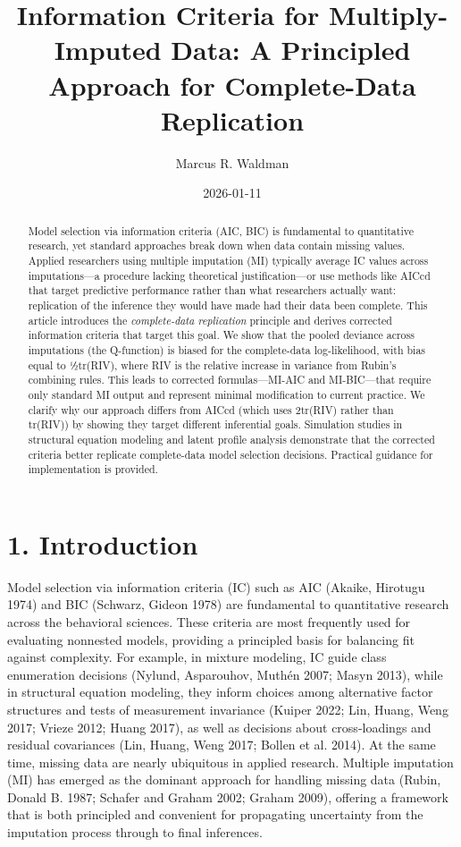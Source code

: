 \documentclass[
]{article}
\title{Information Criteria for Multiply-Imputed Data: A Principled
Approach for Complete-Data Replication}
\author{Marcus R. Waldman}
\date{2026-01-11}
\begin{document}
\maketitle
\begin{abstract}
Model selection via information criteria (AIC, BIC) is fundamental to
quantitative research, yet standard approaches break down when data
contain missing values. Applied researchers using multiple imputation
(MI) typically average IC values across imputations---a procedure
lacking theoretical justification---or use methods like AICcd that
target predictive performance rather than what researchers actually
want: replication of the inference they would have made had their data
been complete. This article introduces the \emph{complete-data
replication} principle and derives corrected information criteria that
target this goal. We show that the pooled deviance across imputations
(the Q-function) is biased for the complete-data log-likelihood, with
bias equal to ½tr(RIV), where RIV is the relative increase in variance
from Rubin's combining rules. This leads to corrected formulas---MI-AIC
and MI-BIC---that require only standard MI output and represent minimal
modification to current practice. We clarify why our approach differs
from AICcd (which uses 2tr(RIV) rather than tr(RIV)) by showing they
target different inferential goals. Simulation studies in structural
equation modeling and latent profile analysis demonstrate that the
corrected criteria better replicate complete-data model selection
decisions. Practical guidance for implementation is provided.
\end{abstract}


\section{1. Introduction}\label{sec-intro}

Model selection via information criteria (IC) such as AIC (Akaike,
Hirotugu 1974) and BIC (Schwarz, Gideon 1978) are fundamental to
quantitative research across the behavioral sciences. These criteria are
most frequently used for evaluating nonnested models, providing a
principled basis for balancing fit against complexity. For example, in
mixture modeling, IC guide class enumeration decisions (Nylund,
Asparouhov, Muthén 2007; Masyn 2013), while in structural equation
modeling, they inform choices among alternative factor structures and
tests of measurement invariance (Kuiper 2022; Lin, Huang, Weng 2017;
Vrieze 2012; Huang 2017), as well as decisions about cross-loadings and
residual covariances (Lin, Huang, Weng 2017; Bollen et al. 2014). At the
same time, missing data are nearly ubiquitous in applied research.
Multiple imputation (MI) has emerged as the dominant approach for
handling missing data (Rubin, Donald B. 1987; Schafer and Graham 2002;
Graham 2009), offering a framework that is both principled and
convenient for propagating uncertainty from the imputation process
through to final inferences.
\end{document}
